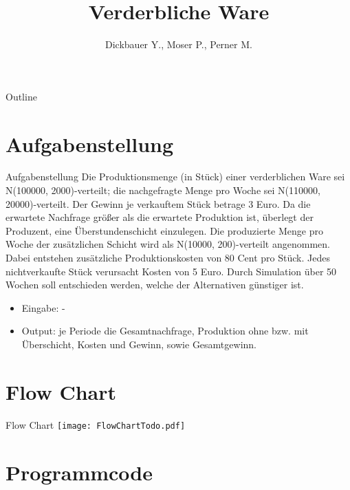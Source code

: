 

\title[BSP19 - Verderbliche Ware]{Verderbliche Ware}
\author{Dickbauer Y., Moser P., Perner M.}



\begin{frame}
  \titlepage
\end{frame}

\begin{frame}{Outline}
  \tableofcontents
\end{frame}

\section{Aufgabenstellung}
\begin{frame}{Aufgabenstellung}
Die Produktionsmenge (in Stück) einer verderblichen Ware sei N(100000, 2000)-verteilt;
die nachgefragte Menge pro Woche sei N(110000, 20000)-verteilt. Der Gewinn je verkauftem
Stück betrage 3 Euro.
Da die erwartete Nachfrage größer als die erwartete Produktion ist, überlegt der Produzent,
eine Überstundenschicht einzulegen. Die produzierte Menge pro Woche der zusätzlichen
Schicht wird als N(10000, 200)-verteilt angenommen. Dabei entstehen zusätzliche
Produktionskosten von 80 Cent pro Stück. Jedes nichtverkaufte Stück verursacht Kosten
von 5 Euro. Durch Simulation über 50 Wochen soll entschieden werden, welche der
Alternativen günstiger ist.

\begin{itemize}
  \item Eingabe: -
  \item Output: je Periode die Gesamtnachfrage, Produktion ohne bzw. mit Überschicht,
Kosten und Gewinn, sowie Gesamtgewinn.
\end{itemize}
\end{frame}


\section{Flow Chart}
\begin{frame}{Flow Chart}
	\centering
  	\texttt{[image: FlowChartTodo.pdf]}
\end{frame}

\section{Programmcode}
